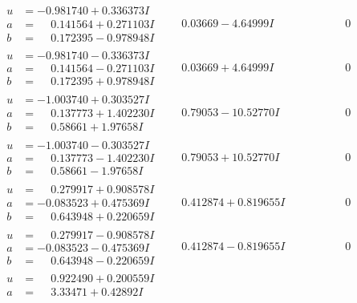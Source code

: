 \documentclass[1p]{elsarticle_modified}
\theoremstyle{definition}
\begin{document}
$$\begin{array}{c|c|c}
\begin{aligned}
u &= -0.981740 + 0.336373 I \\
a &= \phantom{-}0.141564 + 0.271103 I \\
b &= \phantom{-}0.172395 - 0.978948 I\end{aligned}
 & \phantom{-}0.03669 - 4.64999 I & \phantom{-0.000000 } 0 \\ \hline\begin{aligned}
u &= -0.981740 - 0.336373 I \\
a &= \phantom{-}0.141564 - 0.271103 I \\
b &= \phantom{-}0.172395 + 0.978948 I\end{aligned}
 & \phantom{-}0.03669 + 4.64999 I & \phantom{-0.000000 } 0 \\ \hline\begin{aligned}
u &= -1.003740 + 0.303527 I \\
a &= \phantom{-}0.137773 + 1.402230 I \\
b &= \phantom{-}0.58661 + 1.97658 I\end{aligned}
 & \phantom{-}0.79053 - 10.52770 I & \phantom{-0.000000 } 0 \\ \hline\begin{aligned}
u &= -1.003740 - 0.303527 I \\
a &= \phantom{-}0.137773 - 1.402230 I \\
b &= \phantom{-}0.58661 - 1.97658 I\end{aligned}
 & \phantom{-}0.79053 + 10.52770 I & \phantom{-0.000000 } 0 \\ \hline\begin{aligned}
u &= \phantom{-}0.279917 + 0.908578 I \\
a &= -0.083523 + 0.475369 I \\
b &= \phantom{-}0.643948 + 0.220659 I\end{aligned}
 & \phantom{-}0.412874 + 0.819655 I & \phantom{-0.000000 } 0 \\ \hline\begin{aligned}
u &= \phantom{-}0.279917 - 0.908578 I \\
a &= -0.083523 - 0.475369 I \\
b &= \phantom{-}0.643948 - 0.220659 I\end{aligned}
 & \phantom{-}0.412874 - 0.819655 I & \phantom{-0.000000 } 0 \\ \hline\begin{aligned}
u &= \phantom{-}0.922490 + 0.200559 I \\
a &= \phantom{-}3.33471 + 0.42892 I \\

\end{aligned}
\end{array}$$
\end{document}
